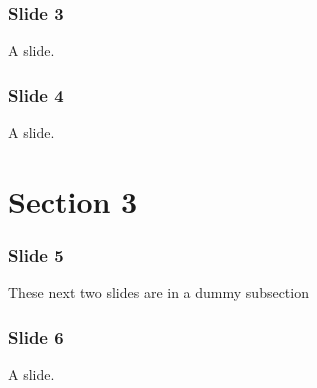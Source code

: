 \documentclass[t]{beamer}
\begin{document}
\begin{frame}[fragile]
\frametitle{Slide 3}


A slide.

\end{frame}

\begin{frame}[fragile]
\frametitle{Slide 4}


A slide.

\end{frame}


\section{Section 3%
  \label{section-3}%
}

\begin{frame}[fragile]
\frametitle{Slide 5}


These next two slides are in a \textquotedbl{}dummy\textquotedbl{} subsection

\end{frame}

\begin{frame}[fragile]
\frametitle{Slide 6}


A slide.

\end{frame}
\end{document}
